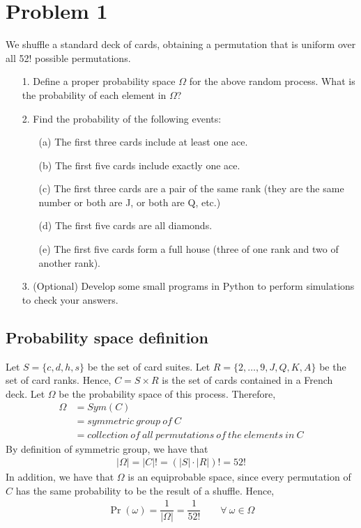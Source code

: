 
\section{Problem 1}

We shuffle a standard deck of cards, obtaining a permutation that is uniform over all
52! possible permutations.
\begin{itemize}
	\item[1.] Define a proper probability space $\Omega$ for the above random process. What is the probability of each element in $\Omega$?
	\item[2.] Find the probability of the following events:
	\begin{itemize}
		\item[(a)] The first three cards include at least one ace.
		\item[(b)] The first five cards include exactly one ace.
		\item[(c)] The first three cards are a pair of the same rank (they are the same number or both are J, or both are Q, etc.)
		\item[(d)] The first five cards are all diamonds.
		\item[(e)] The first five cards form a full house (three of one rank and two of another rank).		
	\end{itemize}
	\item[3.] (Optional) Develop some small programs in Python to perform simulations to check your answers.
\end{itemize}


\subsection{Probability space definition}

Let $S = \{c, d, h, s\}$ be the set of card suites. Let $R = \{2, \ldots, 9, J, Q, K, A\}$ be the set of card ranks. Hence, $C = S \times R$ is the set of cards contained in a French deck. Let $\Omega$ be the probability space of this process. Therefore,
\begin{align*}
	\Omega &= Sym(C)\\
		&= symmetric \ group \ of \ C\\
		&= collection \ of \ all \ permutations \ of \ the \ elements \ in \ C
\end{align*}
By definition of symmetric group\cite{sym_group}, we have that
\begin{align*}
	|\Omega| = |C|! = (|S| \cdot |R|)! = 52!
\end{align*}
In addition, we have that $\Omega$ is an equiprobable space, since every permutation of $C$ has the same probability to be the result of a shuffle. Hence,
\begin{align*}
	\Pr(\omega) = \dfrac{1}{|\Omega|} = \dfrac{1}{52!} \qquad \forall \ \omega\in\Omega
\end{align*}



